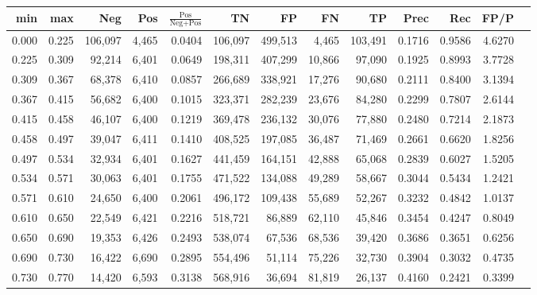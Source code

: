 \begin{tabular}{rrrrrrrrrrrrr}
\toprule
  min &   max &     Neg &   Pos & $\frac{\text{Pos}}{\text{Neg}+\text{Pos}}$ &      TN &      FP &      FN &      TP &   Prec &    Rec &   FP/P \\
\midrule
0.000 & 0.225 & 106,097 & 4,465 &                                     0.0404 & 106,097 & 499,513 &   4,465 & 103,491 & 0.1716 & 0.9586 & 4.6270 \\
0.225 & 0.309 &  92,214 & 6,401 &                                     0.0649 & 198,311 & 407,299 &  10,866 &  97,090 & 0.1925 & 0.8993 & 3.7728 \\
0.309 & 0.367 &  68,378 & 6,410 &                                     0.0857 & 266,689 & 338,921 &  17,276 &  90,680 & 0.2111 & 0.8400 & 3.1394 \\
0.367 & 0.415 &  56,682 & 6,400 &                                     0.1015 & 323,371 & 282,239 &  23,676 &  84,280 & 0.2299 & 0.7807 & 2.6144 \\
0.415 & 0.458 &  46,107 & 6,400 &                                     0.1219 & 369,478 & 236,132 &  30,076 &  77,880 & 0.2480 & 0.7214 & 2.1873 \\
0.458 & 0.497 &  39,047 & 6,411 &                                     0.1410 & 408,525 & 197,085 &  36,487 &  71,469 & 0.2661 & 0.6620 & 1.8256 \\
0.497 & 0.534 &  32,934 & 6,401 &                                     0.1627 & 441,459 & 164,151 &  42,888 &  65,068 & 0.2839 & 0.6027 & 1.5205 \\
0.534 & 0.571 &  30,063 & 6,401 &                                     0.1755 & 471,522 & 134,088 &  49,289 &  58,667 & 0.3044 & 0.5434 & 1.2421 \\
0.571 & 0.610 &  24,650 & 6,400 &                                     0.2061 & 496,172 & 109,438 &  55,689 &  52,267 & 0.3232 & 0.4842 & 1.0137 \\
0.610 & 0.650 &  22,549 & 6,421 &                                     0.2216 & 518,721 &  86,889 &  62,110 &  45,846 & 0.3454 & 0.4247 & 0.8049 \\
0.650 & 0.690 &  19,353 & 6,426 &                                     0.2493 & 538,074 &  67,536 &  68,536 &  39,420 & 0.3686 & 0.3651 & 0.6256 \\
0.690 & 0.730 &  16,422 & 6,690 &                                     0.2895 & 554,496 &  51,114 &  75,226 &  32,730 & 0.3904 & 0.3032 & 0.4735 \\
0.730 & 0.770 &  14,420 & 6,593 &                                     0.3138 & 568,916 &  36,694 &  81,819 &  26,137 & 0.4160 & 0.2421 & 0.3399 \\

\end{tabular}
